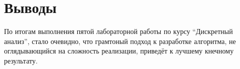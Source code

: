 \section{Выводы}

По итогам выполнения пятой лабораторной работы по курсу \enquote{Дискретный анализ}, стало очевидно, что грамтоный подход к разработке алгоритма, не оглядывающийся на сложность реализации, приведёт к лучшему кнечному результату.

\pagebreak
